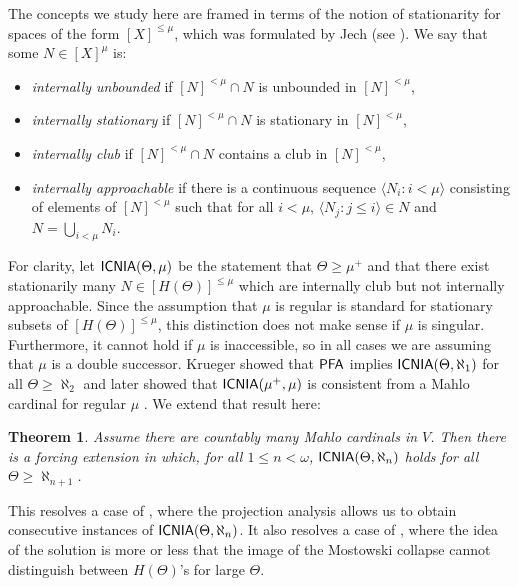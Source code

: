 \documentclass[a4paper]{amsart}
\theoremstyle{definition}
\theoremstyle{remark}
\theoremstyle{plain}
\newtheorem{mysen}[mydef]{Theorem}
\numberwithin{mydef}{section}
\DeclareMathOperator{\ICNIA}{\textup{\textsf{ICNIA}}}
\newcommand{\seq}[2]{\langle #1 : #2 \rangle}
\begin{document}


The concepts we study here are framed in terms of the notion of stationarity for spaces of the form $[X]^{\le \mu}$, which was formulated by Jech (see \cite{Jech2003}). We say that some $N \in [X]^\mu$ is:

\begin{itemize}
\item \emph{internally unbounded} if $[N]^{<\mu}\cap N$ is unbounded in $[N]^{<\mu}$,
\item \emph{internally stationary} if $[N]^{<\mu} \cap N$ is stationary in $[N]^{<\mu}$,
\item \emph{internally club} if $[N]^{<\mu} \cap N$ contains a club in $[N]^{<\mu}$,
\item \emph{internally approachable} if there is a continuous sequence $\seq{N_i}{i<\mu}$ consisting of elements of $[N]^{<\mu}$ such that for all $i<\mu$, $\seq{N_j}{j \le i} \in N$ and $N = \bigcup_{i<\mu}N_i$.
\end{itemize}

For clarity, let $\ICNIA(\Theta,\mu)$ be the statement that $\Theta \ge \mu^+$ and that there exist stationarily many $N\in[H(\Theta)]^{\leq\mu}$ which are internally club but not internally approachable. Since the assumption that $\mu$ is regular is standard for stationary subsets of $[H(\Theta)]^{\leq \mu}$, this distinction does not make sense if $\mu$ is singular. Furthermore, it cannot hold if $\mu$ is inaccessible, so in all cases we are assuming that $\mu$ is a double successor. Krueger showed that $\textup{\textsf{PFA}}$ implies $\ICNIA(\Theta,\aleph_1)$ for all $\Theta \ge \aleph_2$ \cite{Krueger2007} and later showed that $\ICNIA(\mu^+,\mu)$ is consistent from a Mahlo cardinal for regular $\mu$ \cite{Krueger2009}. We extend that result here:
	


\begin{mysen}\label{omega-theorem} Assume there are countably many Mahlo cardinals in $V$. Then there is a forcing extension in which, for all $1 \le n < \omega$, $\ICNIA(\Theta,\aleph_n)$ holds for all $\Theta \ge \aleph_{n+1}$.\end{mysen}

This resolves a case of \cite[Question 12.9]{Krueger2009}, where the projection analysis allows us to obtain consecutive instances of $\ICNIA(\Theta,\aleph_n)$. It also resolves a case of \cite[Question 12.7]{Krueger2009}, where the idea of the solution is more or less that the image of the Mostowski collapse cannot distinguish between $H(\Theta)$'s for large $\Theta$.
\end{document}
